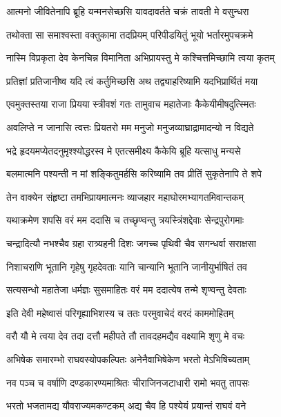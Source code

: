 \twolineshloka
{आत्मनो जीवितेनापि ब्रूहि यन्मनसेच्छसि}
{यावदावर्तते चक्रं तावती मे वसुन्धरा} %

\twolineshloka
{तथोक्ता सा समाश्वस्ता वक्तुकामा तदप्रियम्}
{परिपीडयितुं भूयो भर्तारमुपचक्रमे} %

\twolineshloka
{नास्मि विप्रकृता देव केनचिन्न विमानिता}
{अभिप्रायस्तु मे कश्चित्तमिच्छामि त्वया कृतम्} %

\twolineshloka
{प्रतिज्ञां प्रतिजानीष्व यदि त्वं कर्तुमिच्छसि}
{अथ तद्व्याहरिष्यामि यदभिप्रार्थितं मया} %

\twolineshloka
{एवमुक्तस्तया राजा प्रियया स्त्रीवशं गतः}
{तामुवाच महातेजाः कैकेयीमीषदुत्स्मितः} %

\twolineshloka
{अवलिप्ते न जानासि त्वत्तः प्रियतरो मम}
{मनुजो मनुजव्याघ्राद्रामादन्यो न विद्यते} %

\twolineshloka
{भद्रे हृदयमप्येतदनुमृश्श्योद्धरस्व मे}
{एतत्समीक्ष्य कैकेयि ब्रूहि यत्साधु मन्यसे} %

\twolineshloka
{बलमात्मनि पश्यन्ती न मां शङ्कितुमर्हसि}
{करिष्यामि तव प्रीतिं सुकृतेनापि ते शपे} %

\twolineshloka
{तेन वाक्येन संहृष्टा तमभिप्रायमात्मनः}
{व्याजहार महाघोरमभ्यागतमिवान्तकम्} %

\twolineshloka
{यथाक्रमेण शपसि वरं मम ददासि च}
{तच्छृण्वन्तु त्रयस्त्रिंशद्देवाः सेन्द्रपुरोगमाः} %

\twolineshloka
{चन्द्रादित्यौ नभश्चैव ग्रहा रात्र्यहनी दिशः}
{जगच्च पृथिवी चैव सगन्धर्वा सराक्षसा} %

\twolineshloka
{निशाचराणि भूतानि गृहेषु गृहदेवताः}
{यानि चान्यानि भूतानि जानीयुर्भाषितं तव} %

\twolineshloka
{सत्यसन्धो महातेजा धर्मज्ञः सुसमाहितः}
{वरं मम ददात्येष तन्मे शृण्वन्तु देवताः} %

\twolineshloka
{इति देवी महेष्वासं परिगृह्याभिशस्य च}
{ततः परमुवाचेदं वरदं काममोहितम्} %

\twolineshloka
{वरौ यौ मे त्वया देव तदा दत्तौ महीपते}
{तौ तावदहमद्यैव वक्ष्यामि शृणु मे वचः} %

\twolineshloka
{अभिषेक समारम्भो राघवस्योपकल्पितः}
{अनेनैवाभिषेकेण भरतो मेऽभिषिच्यताम्} %

\twolineshloka
{नव पञ्च च वर्षाणि दण्डकारण्यमाश्रितः}
{चीराजिनजटाधारी रामो भवतु तापसः} %

\twolineshloka
{भरतो भजतामद्य यौवराज्यमकण्टकम्}
{अद्य चैव हि पश्येयं प्रयान्तं राघवं वने} %

